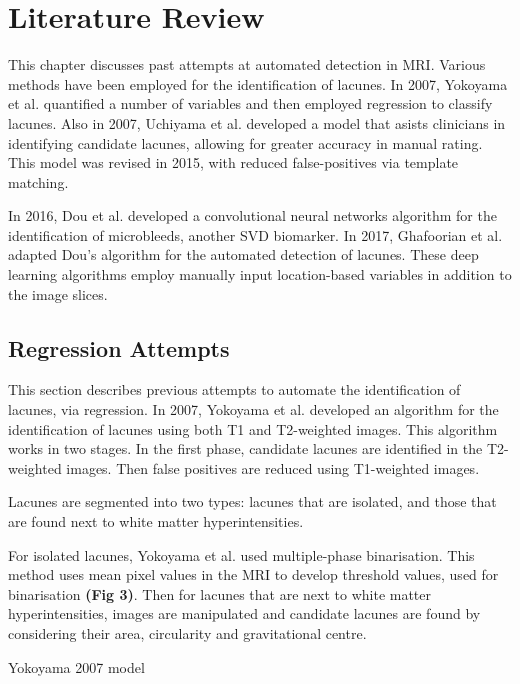 \documentclass[honours,12pt]{unswthesis}
\numberwithin{equation}{section}
\begin{document}
\chapter{Literature Review}\label{litrev-intro}

This chapter discusses past attempts at automated detection in MRI. Various methods have been employed for the identification of lacunes. In 2007, Yokoyama et al. \cite{Yokoyama2007} quantified a number of variables and then employed regression to classify lacunes. Also in 2007, Uchiyama et al. \cite{Uchiyama20071554} developed a model that asists clinicians in identifying candidate lacunes, allowing for greater accuracy in manual rating. This model was revised in 2015\cite{Uchiyama2015}, with reduced false-positives via template matching.

In 2016, Dou et al. \cite{DouQ.2016ADoC} developed a convolutional neural networks algorithm for the identification of microbleeds, another SVD biomarker. In 2017, Ghafoorian et al. \cite{GhafoorianM.2017Dml3} adapted Dou's algorithm for the automated detection of lacunes. These deep learning algorithms employ manually input location-based variables in addition to the image slices.


\section{Regression Attempts}\label{litrev-reg}

This section describes previous attempts to automate the identification of lacunes, via regression. In 2007, Yokoyama et al. \cite{Yokoyama2007} developed an algorithm for the identification of lacunes using both T1 and T2-weighted images. This algorithm works in two stages. In the first phase, candidate lacunes are identified in the T2-weighted images. Then false positives are reduced using T1-weighted images.

Lacunes are segmented into two types: lacunes that are isolated, and those that are found next to white matter hyperintensities.

For isolated lacunes, Yokoyama et al. used multiple-phase binarisation. This method uses mean pixel values in the MRI to develop threshold values, used for binarisation \textbf{(Fig 3)}. Then for lacunes that are next to white matter hyperintensities, images are manipulated and candidate lacunes are found by considering their area, circularity and gravitational centre.

Yokoyama 2007 model
 
\end{document}
